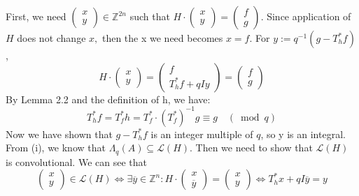 First, we need $\left(\begin{array}{c}{x} \\ {y}\end{array}\right) \in \mathbb{Z}^{2 n}$ such that $H \cdot\left(\begin{array}{c}{x} \\ {y}\end{array}\right)=\left(\begin{array}{l}{f} \\ {g}\end{array}\right) .$ Since application of $H$ does not change $x,$ then the x we need becomes $x=f .$ For $y :=q^{-1}\left(g-T_{h}^{*} f\right)$, \newline
\begin{equation}
    H \cdot\left(\begin{array}{l}{x} \\ {y}\end{array}\right)=\left(\begin{array}{c}{f} \\ {T_{h}^{*} f+q I y}\end{array}\right)=\left(\begin{array}{l}{f} \\ {g}\end{array}\right)
\end{equation}
By Lemma 2.2 and the definition of h, we have:
\begin{equation}
    T_{h}^{*} f=T_{f}^{*} h=T_{f}^{*} \cdot\left(T_{f}^{*}\right)^{-1} g \equiv g \quad(\bmod q)
\end{equation}
Now we have shown that $g-T_{h}^{*} f$ is an integer multiple of $q$, so y is an integral.
\newline
From (i), we know that $\Lambda_{q}(A) \subseteq \mathcal{L}(H)$. Then we need to show that $\mathcal{L}(H)$ is convolutional. We can see that\newline
\begin{equation}
    \left(\begin{array}{l}{x} \\ {y}\end{array}\right) \in \mathcal{L}(H) \Leftrightarrow \exists \overline{y} \in \mathbb{Z}^{n} : H \cdot\left(\begin{array}{l}{x} \\ {\overline{y}}\end{array}\right)=\left(\begin{array}{l}{x} \\ {y}\end{array}\right) \Leftrightarrow T_{h}^{*} x+q I \overline{y}=y
\end{equation}
